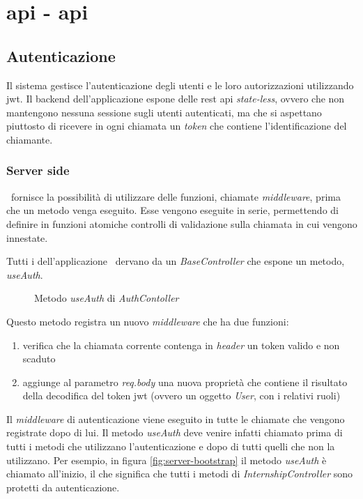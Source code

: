 \chapter{\acrshort{api} - \acrlong{api}}

\section{Autenticazione}
\label{chap:api}

Il sistema gestisce l'autenticazione degli utenti e le loro autorizzazioni utilizzando \gls{jwt}. Il \gls{backend} dell'applicazione espone delle \acrshort{rest} \acrshort{api} \textit{state-less}, ovvero che non mantengono nessuna sessione sugli utenti autenticati, ma che si aspettano piuttosto di ricevere in ogni chiamata un \textit{token} che contiene l'identificazione del chiamante.

\subsection{Server side}

\expressjs~fornisce la possibilità di utilizzare delle funzioni, chiamate \textit{middleware}, prima che un metodo venga eseguito. Esse vengono eseguite in serie, permettendo di definire in funzioni atomiche controlli di validazione sulla chiamata in cui vengono innestate.

Tutti i \textit{} dell'applicazione \nodejs~dervano da un \textit{BaseController} che espone un metodo, \textit{useAuth}.

\begin{figure}[H] 
	\centering    
	
	\caption[Metodo \textit{useAuth} di \textit{AuthContoller}]{Metodo \textit{useAuth} di \textit{AuthContoller}}
	\label{fig:server-base-controller}
\end{figure}

\noindent
Questo metodo registra un nuovo \textit{middleware} che ha due funzioni:
\begin{enumerate}
	\item verifica che la chiamata corrente contenga in \textit{header} un token valido e non scaduto
	\item aggiunge al parametro \textit{req.body} una nuova proprietà che contiene il risultato della decodifica del token \acrshort{jwt} (ovvero un oggetto \textit{User}, con i relativi ruoli)
\end{enumerate}
Il \textit{middleware} di autenticazione viene eseguito in tutte le chiamate che vengono registrate dopo di lui. Il metodo \textit{useAuth} deve venire infatti chiamato prima di tutti i metodi che utilizzano l'autenticazione e dopo di tutti quelli che non la utilizzano. Per esempio, in figura \ref{fig:server-bootstrap} il metodo \textit{useAuth} è chiamato all'inizio, il che significa che tutti i metodi di \textit{InternshipController} sono protetti da autenticazione.

